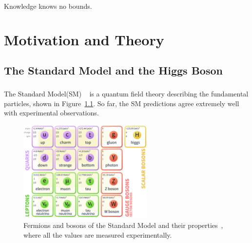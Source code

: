 \begin{savequote}[75mm]
Knowledge knows no bounds.
\end{savequote}

\chapter{Motivation and Theory}

\section{The Standard Model and the Higgs Boson}
\paragraph{}
The Standard Model(SM) ~\cite{Pdg,Griffiths,Tully,Schwartz} is a quantum field theory describing the fundamental particles, shown in Figure~\ref{fig:SM}. So far, the SM predictions agree extremely well with experimental observations.

\begin{figure}[h!]
  \centering
  \captionsetup{justification=centering}
  \includegraphics[width=0.6\textwidth]{figures/theory/SM}
  \caption{Fermions and bosons of the Standard Model and their properties~\cite{Pdg}, where all the values are measured experimentally.}
  \label{fig:SM}
\end{figure}

